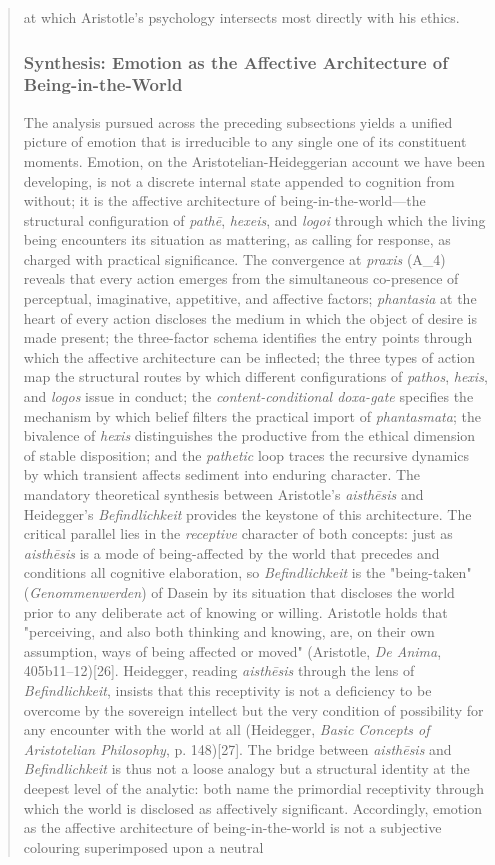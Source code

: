 \documentclass{article}
\begin{document}
\begin{quote}
at which Aristotle's psychology intersects most directly with his ethics. \subsubsection*{Synthesis: Emotion as the Affective Architecture of Being-in-the-World} The analysis pursued across the preceding subsections yields a unified picture of emotion that is irreducible to any single one of its constituent moments. Emotion, on the Aristotelian-Heideggerian account we have been developing, is not a discrete internal state appended to cognition from without; it is the affective architecture of being-in-the-world---the structural configuration of \textit{pathē}, \textit{hexeis}, and \textit{logoi} through which the living being encounters its situation as mattering, as calling for response, as charged with practical significance. The convergence at \textit{praxis} (A\_4) reveals that every action emerges from the simultaneous co-presence of perceptual, imaginative, appetitive, and affective factors; \textit{phantasia} at the heart of every action discloses the medium in which the object of desire is made present; the three-factor schema identifies the entry points through which the affective architecture can be inflected; the three types of action map the structural routes by which different configurations of \textit{pathos}, \textit{hexis}, and \textit{logos} issue in conduct; the \textit{content-conditional doxa-gate} specifies the mechanism by which belief filters the practical import of \textit{phantasmata}; the bivalence of \textit{hexis} distinguishes the productive from the ethical dimension of stable disposition; and the \textit{pathetic} loop traces the recursive dynamics by which transient affects sediment into enduring character. The mandatory theoretical synthesis between Aristotle's \textit{aisthēsis} and Heidegger's \textit{Befindlichkeit} provides the keystone of this architecture. The critical parallel lies in the \textit{receptive} character of both concepts: just as \textit{aisthēsis} is a mode of being-affected by the world that precedes and conditions all cognitive elaboration, so \textit{Befindlichkeit} is the "being-taken" (\textit{Genommenwerden}) of Dasein by its situation that discloses the world prior to any deliberate act of knowing or willing. Aristotle holds that "perceiving, and also both thinking and knowing, are, on their own assumption, ways of being affected or moved" (Aristotle, \textit{De Anima}, 405b11--12)[26]. Heidegger, reading \textit{aisthēsis} through the lens of \textit{Befindlichkeit}, insists that this receptivity is not a deficiency to be overcome by the sovereign intellect but the very condition of possibility for any encounter with the world at all (Heidegger, \textit{Basic Concepts of Aristotelian Philosophy}, p. 148)[27]. The bridge between \textit{aisthēsis} and \textit{Befindlichkeit} is thus not a loose analogy but a structural identity at the deepest level of the analytic: both name the primordial receptivity through which the world is disclosed as affectively significant. Accordingly, emotion as the affective architecture of being-in-the-world is not a subjective colouring superimposed upon a neutral 
\end{quote}
\end{document}
